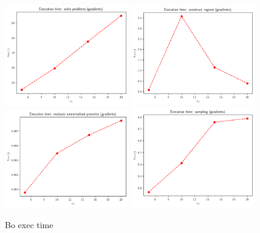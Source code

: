\begin{figure}[h]
    \begin{center}
      \includegraphics[width=0.48\textwidth]{./Thesis/images/chapter4/exec_solve_bo.png}
      \includegraphics[width=0.48\textwidth]{./Thesis/images/chapter4/exec_regions_bo.png}\\
      \includegraphics[width=0.48\textwidth]{./Thesis/images/chapter4/exec_posterior_bo.png}
      \includegraphics[width=0.48\textwidth]{./Thesis/images/chapter4/exec_sample_bo.png}      
    \end{center}
    \caption{Bo exec time}
  \label{fig:exec_bo}
\end{figure}
